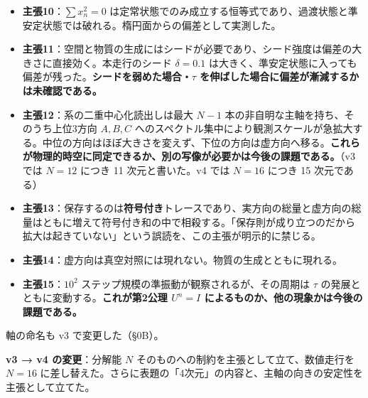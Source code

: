 \documentclass[
  10pt,
]{ltjsarticle}
\providecommand{\tightlist}{%
  \setlength{\itemsep}{0pt}\setlength{\parskip}{0pt}}
\begin{document}
\begin{itemize}
\tightlist
\item
  \textbf{主張10}：\(\sum x_n^2 = 0\)
  は定常状態でのみ成立する恒等式であり、過渡状態と準安定状態では破れる。楕円面からの偏差として実測した。
\item
  \textbf{主張11}：空間と物質の生成にはシードが必要であり、シード強度は偏差の大きさに直接効く。本走行のシード
  \(\delta = 0.1\)
  は大きく、準安定状態に入っても偏差が残った。\textbf{シードを弱めた場合・\(\tau\)
  を伸ばした場合に偏差が漸減するかは未確認である。}
\item
  \textbf{主張12}：系の二重中心化読出しは最大 \(N-1\)
  本の非自明な主軸を持ち、そのうち上位3方向 \(A,B,C\)
  へのスペクトル集中により観測スケールが急拡大する。中位の方向はほぼ大きさを変えず、下位の方向は虚方向へ移る。\textbf{これらが物理的時空に同定できるか、別の写像が必要かは今後の課題である。}（v3
  では \(N=12\) につき 11 次元と書いた。v4 では \(N=16\) につき 15
  次元である）
\item
  \textbf{主張13}：保存するのは\textbf{符号付き}トレースであり、実方向の総量と虚方向の総量はともに増えて符号付き和の中で相殺する。「保存則が成り立つのだから拡大は起きていない」という誤読を、この主張が明示的に禁じる。
\item
  \textbf{主張14}：虚方向は真空対照には現れない。物質の生成とともに現れる。
\item
  \textbf{主張15}：\(10^2\)
  ステップ規模の準振動が観察されるが、その周期は \(\tau\)
  の発展とともに変動する。\textbf{これが第2公理 \(U^n = I\)
  によるものか、他の現象かは今後の課題である。}
\end{itemize}

軸の命名も v3 で変更した（§0B）。

\textbf{v3 → v4 の変更}：分解能 \(N\)
そのものへの制約を主張として立て、数値走行を \(N=16\)
に差し替えた。さらに表題の「4次元」の内容と、主軸の向きの安定性を主張として立てた。
\end{document}
